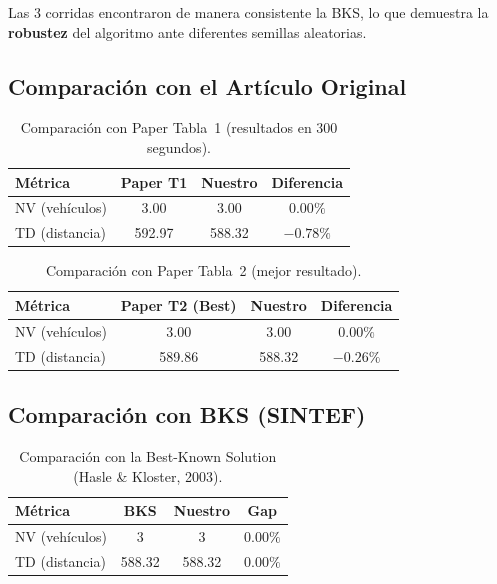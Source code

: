 \documentclass[12pt, letterpaper]{article}
\begin{document}
Las 3 corridas encontraron de manera consistente la BKS, lo que demuestra la \textbf{robustez} del algoritmo ante diferentes semillas aleatorias.

\subsection{Comparación con el Artículo Original}

\begin{table}[H]
  \centering
  \caption{Comparación con Paper Tabla~1 (resultados en 300 segundos).}
  \label{tab:vs_paper_t1}
  \begin{tabular}{lccc}
    \toprule
    \textbf{Métrica} & \textbf{Paper T1} & \textbf{Nuestro} & \textbf{Diferencia} \\
    \midrule
    NV (vehículos) & 3.00 & 3.00 & $0.00\%$ \\
    TD (distancia) & 592.97 & 588.32 & $-0.78\%$ \\
    \bottomrule
  \end{tabular}
\end{table}

\begin{table}[H]
  \centering
  \caption{Comparación con Paper Tabla~2 (mejor resultado).}
  \label{tab:vs_paper_t2}
  \begin{tabular}{lccc}
    \toprule
    \textbf{Métrica} & \textbf{Paper T2 (Best)} & \textbf{Nuestro} & \textbf{Diferencia} \\
    \midrule
    NV (vehículos) & 3.00 & 3.00 & $0.00\%$ \\
    TD (distancia) & 589.86 & 588.32 & $-0.26\%$ \\
    \bottomrule
  \end{tabular}
\end{table}

\subsection{Comparación con BKS (SINTEF)}

\begin{table}[H]
  \centering
  \caption{Comparación con la Best-Known Solution (Hasle \& Kloster, 2003).}
  \label{tab:vs_bks}
  \begin{tabular}{lccc}
    \toprule
    \textbf{Métrica} & \textbf{BKS} & \textbf{Nuestro} & \textbf{Gap} \\
    \midrule
    NV (vehículos) & 3 & 3 & $0.00\%$ \\
    TD (distancia) & 588.32 & 588.32 & $0.00\%$ \\
    \bottomrule
  \end{tabular}
\end{table}
\end{document}
